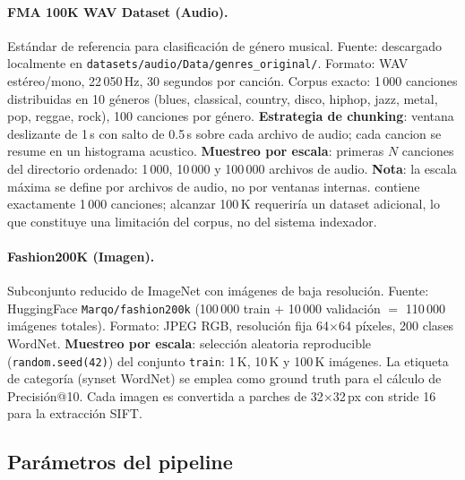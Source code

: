 \documentclass[12pt,a4paper]{article}
\begin{document}
\paragraph{FMA 100K WAV Dataset (Audio).}
Estándar de referencia para clasificación de género musical.
Fuente: descargado localmente en \texttt{datasets/audio/Data/genres\_original/}.
Formato: WAV estéreo/mono, 22\,050\,Hz, 30 segundos por canción.
Corpus exacto: 1\,000 canciones distribuidas en 10 géneros
(blues, classical, country, disco, hiphop, jazz, metal, pop, reggae, rock),
100 canciones por género.
\textbf{Estrategia de chunking}: ventana deslizante de 1\,s con salto de 0.5\,s
sobre cada archivo de audio; cada cancion se resume en un histograma acustico.
\textbf{Muestreo por escala}: primeras $N$ canciones del directorio ordenado:
1\,000, 10\,000 y 100\,000 archivos de audio.
\textbf{Nota}: la escala máxima se define por archivos de audio, no por ventanas internas.
contiene exactamente 1\,000 canciones; alcanzar 100\,K requeriría un dataset
adicional, lo que constituye una limitación del corpus, no del sistema indexador.

\paragraph{Fashion200K (Imagen).}
Subconjunto reducido de ImageNet con imágenes de baja resolución.
Fuente: HuggingFace \texttt{Marqo/fashion200k}
(100\,000 train $+$ 10\,000 validación $=$ 110\,000 imágenes totales).
Formato: JPEG RGB, resolución fija 64$\times$64 píxeles, 200 clases WordNet.
\textbf{Muestreo por escala}: selección aleatoria reproducible
(\texttt{random.seed(42)}) del conjunto \texttt{train}:
1\,K, 10\,K y 100\,K imágenes.
La etiqueta de categoría (synset WordNet) se emplea como ground truth
para el cálculo de Precisión@10.
Cada imagen es convertida a parches de 32$\times$32\,px con stride 16
para la extracción SIFT.

\subsection{Parámetros del pipeline}
\end{document}
